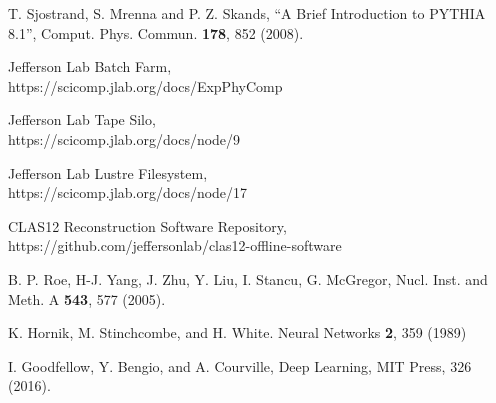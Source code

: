 \documentclass[3p,times,twocolumn]{elsarticle}
\begin{document}
\begin{thebibliography}{99}
T. Sjostrand, S. Mrenna and P. Z. Skands, ``A Brief Introduction to PYTHIA 8.1'', Comput. Phys. Commun. {\bf 178},
852 (2008).

Jefferson Lab Batch Farm, \\https://scicomp.jlab.org/docs/ExpPhyComp

Jefferson Lab Tape Silo, \\https://scicomp.jlab.org/docs/node/9

Jefferson Lab Lustre Filesystem, \\https://scicomp.jlab.org/docs/node/17

CLAS12 Reconstruction Software Repository, \\https://github.com/jeffersonlab/clas12-offline-software

B. P. Roe, H-J. Yang, J. Zhu, Y. Liu, I. Stancu, G. McGregor, Nucl. Inst. and Meth. A {\bf 543}, 577 (2005).

K. Hornik, M. Stinchcombe, and H. White. Neural Networks {\bf 2}, 359 (1989)

I. Goodfellow, Y. Bengio, and A. Courville,  Deep Learning, MIT Press, 326 (2016).

\end{thebibliography}
\end{document}
